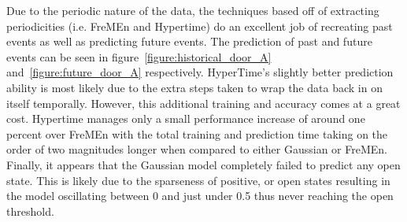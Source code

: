Due to the periodic nature of the data, the techniques based off of extracting
periodicities (i.e. FreMEn and Hypertime) do an excellent job of recreating
past events as well as predicting future events. The prediction of past and future events can be seen in
figure~\ref{figure:historical_door_A} and~\ref{figure:future_door_A} respectively. HyperTime's slightly better
prediction ability is most likely due to the extra steps taken to wrap the data back
in on itself temporally. However, this additional training and accuracy comes at a
great cost. Hypertime manages only a small performance increase of
around one percent over FreMEn with the total training and prediction time
taking on the order of two magnitudes longer when compared to either Gaussian or FreMEn.
Finally, it appears that the Gaussian model completely failed to predict any
open state. This is likely due to the sparseness of positive, or open
states resulting in the model oscillating between 0 and just under 0.5 thus
never reaching the open threshold. \\

